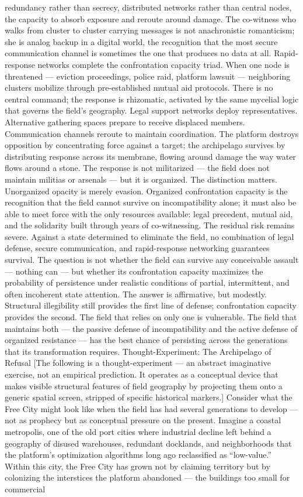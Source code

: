 redundancy rather than secrecy, distributed networks rather than central nodes, the capacity to absorb exposure and reroute around damage. The co-witness who walks from cluster to cluster carrying messages is not anachronistic romanticism; she is analog backup in a digital world, the recognition that the most secure communication channel is sometimes the one that produces no data at all. Rapid-response networks complete the confrontation capacity triad. When one node is threatened — eviction proceedings, police raid, platform lawsuit — neighboring clusters mobilize through pre-established mutual aid protocols. There is no central command; the response is rhizomatic, activated by the same mycelial logic that governs the field’s geography. Legal support networks deploy representatives. Alternative gathering spaces prepare to receive displaced members. Communication channels reroute to maintain coordination. The platform destroys opposition by concentrating force against a target; the archipelago survives by distributing response across its membrane, flowing around damage the way water flows around a stone. The response is not militarized — the field does not maintain militias or arsenals — but it is organized. The distinction matters. Unorganized opacity is merely evasion. Organized confrontation capacity is the recognition that the field cannot survive on incompatibility alone; it must also be able to meet force with the only resources available: legal precedent, mutual aid, and the solidarity built through years of co-witnessing. The residual risk remains severe. Against a state determined to eliminate the field, no combination of legal defense, secure communication, and rapid-response networking guarantees survival. The question is not whether the field can survive any conceivable assault — nothing can — but whether its confrontation capacity maximizes the probability of persistence under realistic conditions of partial, intermittent, and often incoherent state attention. The answer is affirmative, but modestly. Structural illegibility still provides the first line of defense; confrontation capacity provides the second. The field that relies on only one is vulnerable. The field that maintains both — the passive defense of incompatibility and the active defense of organized resistance — has the best chance of persisting across the generations that its transformation requires. Thought-Experiment: The Archipelago of Refusal [The following is a thought-experiment — an abstract imaginative exercise, not an empirical prediction. It operates as a conceptual device that makes visible structural features of field geography by projecting them onto a generic spatial screen, stripped of specific historical markers.] Consider what the Free City might look like when the field has had several generations to develop — not as prophecy but as conceptual pressure on the present. Imagine a coastal metropolis, one of the old port cities where industrial decline left behind a geography of disused warehouses, redundant docklands, and neighborhoods that the platform’s optimization algorithms long ago reclassified as “low-value.” Within this city, the Free City has grown not by claiming territory but by colonizing the interstices the platform abandoned — the buildings too small for commercial 